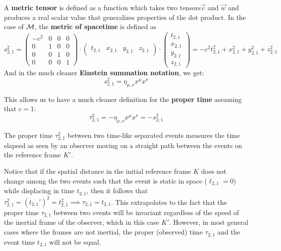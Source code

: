 \documentclass{article}
\begin{document}
		\begin{defn}
			A \textbf{metric tensor} is defined as a function which takes two tensors$\vec{v}$ and $\vec{w}$ and produces a real scalar value that generalizes properties of the dot product. In the case of $\mathcal{M}$, the \textbf{metric of spacetime} is defined as
			$$ s_{2,1}^2 = \begin{pmatrix}
			-c^2 & 0 & 0 & 0 \\
			0 & 1 & 0 & 0 \\
			0 & 0 & 1 & 0 \\
			0 & 0 & 0 & 1
			\end{pmatrix} \cdot \begin{pmatrix}
			t_{2,1} & x_{2,1} & y_{2,1} & z_{2,1} 
			\end{pmatrix} \cdot \begin{pmatrix}
			t_{2,1} \\
			x_{2,1} \\
			y_{2,1} \\
			z_{2,1}
			\end{pmatrix} = - c^2 t_{2,1}^2 + x_{2,1}^2 + y_{2,1}^2 + z_{2,1}^2$$
			And in the much cleaner \textbf{Einstein summation notation}, we get:
			\begin{equation}
				\label{eq:EinsteinSummation}
				\boxed{s_{2,1}^2 = \eta_{\mu, \nu} x^\mu x^\nu}
			\end{equation}
		\end{defn}
	\noindent
		This allows us to have a much cleaner definition for the \textbf{proper time} assuming that $c=1$:
		\begin{equation}
			\label{eq:ProperTimeGR}
			\boxed{\tau_{2,1}^2 = - \eta_{\mu, \nu} x^\mu x^\nu = -s_{2,1}^2}
		\end{equation}
		\begin{thm}
			The proper time $\tau_{2,1}^2$ between two time-like separated events measures the time elapsed as seen by an observer moving on a straight path between the events on the reference frame $K'$.
		\end{thm}
		Notice that if the spatial distance in the initial reference frame $K$ does not change among the two events such that the event is static in space ($\ell_{2,1}=0$) while displacing in time $t_{2,1}$, then it follows that
		$ \tau_{2,1}^2 = (t_{2,1}')^2 = t_{2,1}^2 \implies \tau_{2,1} = t_{2,1}$. This extrapolates to the fact that the proper time $\tau_{2,1}$ between two events will be invariant regardless of the speed of the inertial frame of the observer, which in this case $K'$. However, in most general cases where the frames are not inertial, the proper (observed) time $\tau_{2,1}$ and the event time $t_{2,1}$ will not be equal.
		
\end{document}
